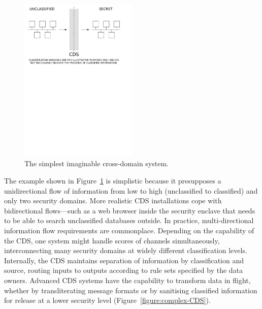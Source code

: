 \documentclass[10pt,letterpaper,conference,compsocconf]{IEEEtran}
\begin{document}
\begin{figure}[!t]
    \centering
	\includegraphics[width=0.5\textwidth,trim=0 19.25cm 2cm 0,clip]{simple-CDS.pdf}
	\caption{The simplest imaginable cross-domain system.}
	\label{figure:simple-CDS}
\end{figure}

The example shown in Figure~\ref{figure:simple-CDS} is simplistic because it
presupposes a unidirectional
flow of information from low to high (unclassified to classified) and
only two security domains.
More realistic CDS installations cope with bidirectional
flows---such as a web browser inside the security enclave that needs
to be able to search unclassified databases outside.  In practice,
multi-directional information flow requirements are commonplace.
Depending on the capability of the CDS, one system might handle scores
of channels simultaneously, interconnecting many security
domains at widely different classification levels.  Internally, the CDS
maintains separation of information by classification and source, routing
inputs to outputs according to rule sets specified by the data owners.
Advanced CDS systems have the capability to transform data in flight,
whether by transliterating message formats or by sanitising classified
information for release at a lower security level (Figure~\ref{figure:complex-CDS}).

%
%
\end{document}
